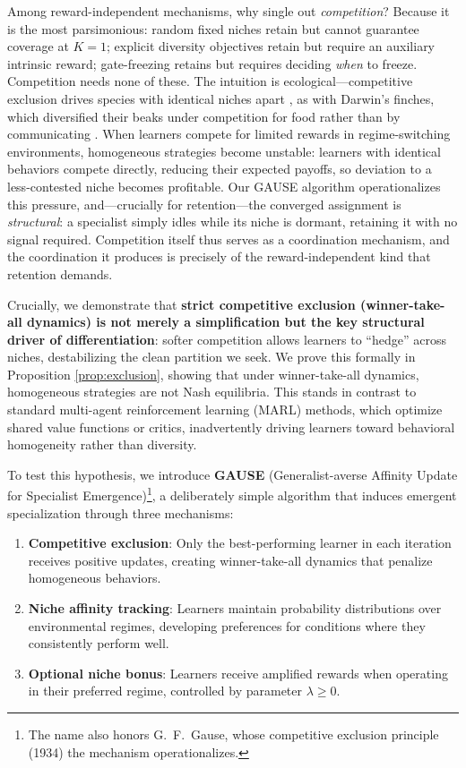 \documentclass{article}
\begin{document}
Among reward-independent mechanisms, why single out \emph{competition}? Because it is the most parsimonious: random fixed niches retain but cannot guarantee coverage at $K{=}1$; explicit diversity objectives retain but require an auxiliary intrinsic reward; gate-freezing retains but requires deciding \emph{when} to freeze. Competition needs none of these. The intuition is ecological---competitive exclusion drives species with identical niches apart \cite{hardin1960competitive}, as with Darwin's finches, which diversified their beaks under competition for food rather than by communicating \cite{grant2014finches}. When learners compete for limited rewards in regime-switching environments, homogeneous strategies become unstable: learners with identical behaviors compete directly, reducing their expected payoffs, so deviation to a less-contested niche becomes profitable. Our GAUSE algorithm operationalizes this pressure, and---crucially for retention---the converged assignment is \emph{structural}: a specialist simply idles while its niche is dormant, retaining it with no signal required. Competition itself thus serves as a coordination mechanism, and the coordination it produces is precisely of the reward-independent kind that retention demands.

Crucially, we demonstrate that \textbf{strict competitive exclusion (winner-take-all dynamics) is not merely a simplification but the key structural driver of differentiation}: softer competition allows learners to ``hedge'' across niches, destabilizing the clean partition we seek. We prove this formally in Proposition \ref{prop:exclusion}, showing that under winner-take-all dynamics, homogeneous strategies are not Nash equilibria. This stands in contrast to standard multi-agent reinforcement learning (MARL) methods, which optimize shared value functions or critics, inadvertently driving learners toward behavioral homogeneity rather than diversity.

To test this hypothesis, we introduce \textbf{GAUSE} (Generalist-averse
Affinity Update for Specialist Emergence)\footnote{The name also honors
G.~F.~Gause, whose competitive exclusion principle (1934) the mechanism
operationalizes.}, a deliberately simple algorithm that induces emergent specialization through three mechanisms:
\begin{enumerate}
    \item \textbf{Competitive exclusion}: Only the best-performing learner in each iteration receives positive updates, creating winner-take-all dynamics that penalize homogeneous behaviors.
    \item \textbf{Niche affinity tracking}: Learners maintain probability distributions over environmental regimes, developing preferences for conditions where they consistently perform well.
    \item \textbf{Optional niche bonus}: Learners receive amplified rewards when operating in their preferred regime, controlled by parameter $\lambda \geq 0$.
\end{enumerate}
\end{document}

